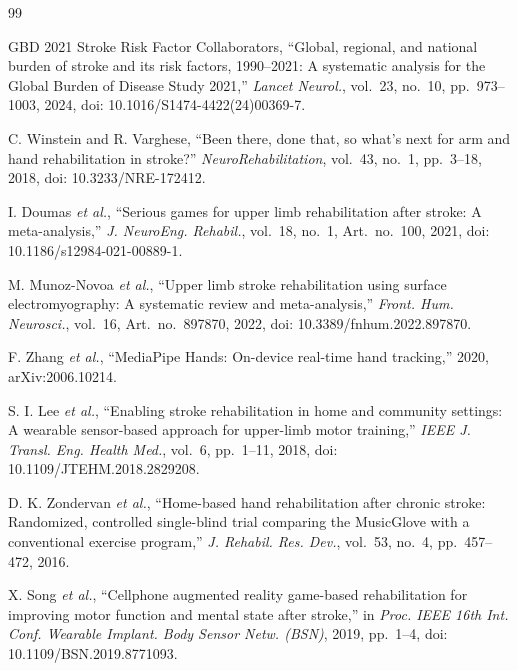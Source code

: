 \documentclass[10pt,a4paper,twocolumn]{article}
\begin{document}
\renewcommand{\refname}{\Roman{section}.\enskip References}
\begin{thebibliography}{99}
\fontsize{9}{10.5}\selectfont
\setlength{\itemsep}{9pt}\setlength{\parsep}{0pt}
\setlength{\labelsep}{6pt}

 GBD 2021 Stroke Risk Factor Collaborators, ``Global, regional, and national burden of stroke and its risk factors, 1990--2021: A systematic analysis for the Global Burden of Disease Study 2021,'' \textit{Lancet Neurol.}, vol.~23, no.~10, pp.~973--1003, 2024, doi: 10.1016/S1474-4422(24)00369-7.

 C. Winstein and R. Varghese, ``Been there, done that, so what's next for arm and hand rehabilitation in stroke?'' \textit{NeuroRehabilitation}, vol.~43, no.~1, pp.~3--18, 2018, doi: 10.3233/NRE-172412.

 I. Doumas \textit{et al.}, ``Serious games for upper limb rehabilitation after stroke: A meta-analysis,'' \textit{J. NeuroEng. Rehabil.}, vol.~18, no.~1, Art.~no.~100, 2021, doi: 10.1186/s12984-021-00889-1.

 M. Munoz-Novoa \textit{et al.}, ``Upper limb stroke rehabilitation using surface electromyography: A systematic review and meta-analysis,'' \textit{Front. Hum. Neurosci.}, vol.~16, Art.~no.~897870, 2022, doi: 10.3389/fnhum.2022.897870.

 F. Zhang \textit{et al.}, ``MediaPipe Hands: On-device real-time hand tracking,'' 2020, arXiv:2006.10214.

 S. I. Lee \textit{et al.}, ``Enabling stroke rehabilitation in home and community settings: A wearable sensor-based approach for upper-limb motor training,'' \textit{IEEE J. Transl. Eng. Health Med.}, vol.~6, pp.~1--11, 2018, doi: 10.1109/JTEHM.2018.2829208.

 D. K. Zondervan \textit{et al.}, ``Home-based hand rehabilitation after chronic stroke: Randomized, controlled single-blind trial comparing the MusicGlove with a conventional exercise program,'' \textit{J. Rehabil. Res. Dev.}, vol.~53, no.~4, pp.~457--472, 2016.

 X. Song \textit{et al.}, ``Cellphone augmented reality game-based rehabilitation for improving motor function and mental state after stroke,'' in \textit{Proc. IEEE 16th Int. Conf. Wearable Implant. Body Sensor Netw. (BSN)}, 2019, pp.~1--4, doi: 10.1109/BSN.2019.8771093.


\end{thebibliography}
\end{document}
